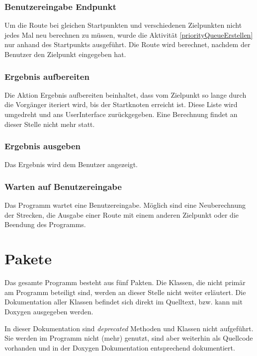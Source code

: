 \documentclass[12pt, a4paper, ngerman]{article}
\newcommand{\todo}[1]{\fcolorbox{red}{yellow}{ \parbox{0.75\linewidth}{#1}}} %
\begin{document}

\subsubsection{Benutzereingabe Endpunkt}
Um die Route bei gleichen Startpunkten und verschiedenen Zielpunkten nicht jedes Mal neu berechnen zu müssen, wurde die Aktivität \ref{priorityQueueErstellen} nur anhand des Startpunkts ausgeführt. Die Route wird berechnet, nachdem der Benutzer den Zielpunkt eingegeben hat.

\subsubsection{Ergebnis aufbereiten}
Die Aktion Ergebnis aufbereiten beinhaltet, dass vom Zielpunkt so lange durch die Vorgänger iteriert wird, bis der Startknoten erreicht ist. Diese Liste wird umgedreht und ans UserInterface zurückgegeben. Eine Berechnung findet an dieser Stelle nicht mehr statt.

\subsubsection{Ergebnis ausgeben}
Das Ergebnis wird dem Benutzer angezeigt.

\subsubsection{Warten auf Benutzereingabe}
Das Programm wartet eine Benutzereingabe. Möglich sind eine Neuberechnung der Strecken, die Ausgabe einer Route mit einem anderen Zielpunkt oder die Beendung des Programms.

\section{Pakete}
Das gesamte Programm besteht aus fünf Pakten. Die Klassen, die nicht primär am Programm beteiligt sind, werden an dieser Stelle nicht weiter erläutert. Die Dokumentation aller Klassen befindet sich direkt im Quelltext, bzw. kann mit Doxygen ausgegeben werden.

In dieser Dokumentation sind \textit{deprecated} Methoden und Klassen nicht aufgeführt. Sie werden im Programm nicht (mehr) genutzt, sind aber weiterhin als Quellcode vorhanden und in der Doxygen Dokumentation entsprechend  dokumentiert.
\end{document}
